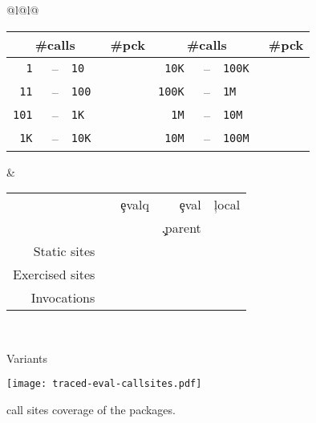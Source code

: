 \documentclass[review,screen,acmsmall]{acmart}
\begin{document}
\begin{figure}[!b]
\small
\begin{tabular}{@{}l@{\hspace{1.5cm}}l@{}}
\begin{minipage} {5cm}\small
  \begin{tabular}{|r@{\,}r@{\,}l@{}r|r@{\,}r@{\,}l@{}r|} \hline
    \multicolumn{3}{|c}{\small\#calls} &\small \#pck
&     \multicolumn{3}{c}{\small\#calls} &\small\#pck \\\hline
\tt 1 &--& \tt 10      & \packageBina  & \tt 10K &--&\tt 100K  & \packageBine\\
\tt 11 &--& \tt 100    & \packageBinb  & \tt 100K &--&\tt 1M  & \packageBinf\\
\tt 101 &--& \tt 1K    & \packageBinc  & \tt 1M &--&\tt 10M   & \packageBing\\
\tt 1K &--& \tt 10K    & \packageBind  & \tt 10M &--& \tt 100M & \packageBinh\\\hline
\end{tabular}
\caption{Call frequency}\label{freq}
\end{minipage}
&
\begin{minipage}{7cm}\small
\begin{tabular}{|@{\,}r|rrrr|}\hline
  &\eval & \c{evalq} & \c{eval} & \c{local}\\[-1.5mm]
           & & & \c{.parent} &\\\hline
\small Static sites &\packageStaticeval&\packageStaticevalq&\packageStaticevalparent&\packageStaticlocal \\
\small Exercised sites&\packageTriggeredeval&\packageTriggeredevalq&\packageTriggeredevalparent&\packageTriggeredlocal\\
\small Invocations&\packageEvalsRnd&\packageEvalqsRnd&\packageEparentsRnd&\packageLocalsRnd\\\hline
\end{tabular}~\\[2mm]\caption{Variants}\label{tab:variantseval}
\end{minipage}\end{tabular}

\end{figure}

\begin{figure}[b] \centering
  \texttt{[image: traced-eval-callsites.pdf]} \centering
  \caption{\eval call sites coverage of the \PkgPackages packages.}%
  \label{fig:traced-eval-callsites}
\end{figure}
\end{document}
